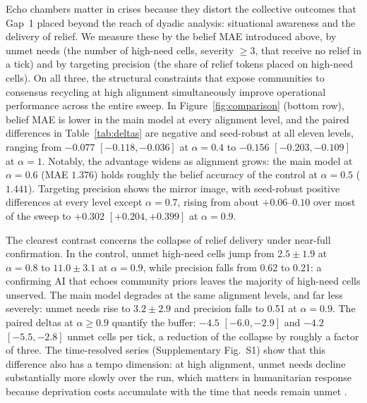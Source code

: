 \documentclass[sn-apacite]{sn-jnl}
\begin{document}
Echo chambers matter in crises because they distort the collective outcomes that Gap~1 placed beyond the reach of dyadic analysis: situational awareness and the delivery of relief. We measure these by the belief MAE introduced above, by unmet needs (the number of high-need cells, severity $\geq 3$, that receive no relief in a tick) and by targeting precision (the share of relief tokens placed on high-need cells). On all three, the structural constraints that expose communities to consensus recycling at high alignment simultaneously improve operational performance across the entire sweep. In Figure~\ref{fig:comparison} (bottom row), belief MAE is lower in the main model at every alignment level, and the paired differences in Table~\ref{tab:deltas} are negative and seed-robust at all eleven levels, ranging from $-0.077$ $[-0.118, -0.036]$ at $\alpha = 0.4$ to $-0.156$ $[-0.203, -0.109]$ at $\alpha = 1$. Notably, the advantage widens as alignment grows: the main model at $\alpha = 0.6$ (MAE $1.376$) holds roughly the belief accuracy of the control at $\alpha = 0.5$ ($1.441$). Targeting precision shows the mirror image, with seed-robust positive differences at every level except $\alpha = 0.7$, rising from about $+0.06$--$0.10$ over most of the sweep to $+0.302$ $[+0.204, +0.399]$ at $\alpha = 0.9$.

The clearest contrast concerns the collapse of relief delivery under near-full confirmation. In the control, unmet high-need cells jump from $2.5 \pm 1.9$ at $\alpha = 0.8$ to $11.0 \pm 3.1$ at $\alpha = 0.9$, while precision falls from 0.62 to 0.21: a confirming AI that echoes community priors leaves the majority of high-need cells unserved. The main model degrades at the same alignment levels, and far less severely: unmet needs rise to $3.2 \pm 2.9$ and precision falls to 0.51 at $\alpha = 0.9$. The paired deltas at $\alpha \geq 0.9$ quantify the buffer: $-4.5$ $[-6.0, -2.9]$ and $-4.2$ $[-5.5, -2.8]$ unmet cells per tick, a reduction of the collapse by roughly a factor of three. The time-resolved series (Supplementary Fig.~S1) show that this difference also has a tempo dimension: at high alignment, unmet needs decline substantially more slowly over the run, which matters in humanitarian response because deprivation costs accumulate with the time that needs remain unmet \citep{holguin2012unique}.
\end{document}
